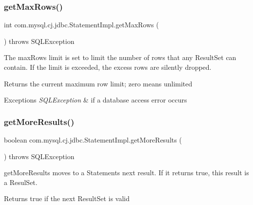 \subsubsection{\texorpdfstring{get\+Max\+Rows()}{getMaxRows()}}
{\footnotesize\ttfamily int com.\+mysql.\+cj.\+jdbc.\+Statement\+Impl.\+get\+Max\+Rows (\begin{DoxyParamCaption}{ }\end{DoxyParamCaption}) throws S\+Q\+L\+Exception}

The max\+Rows limit is set to limit the number of rows that any Result\+Set can contain. If the limit is exceeded, the excess rows are silently dropped.

\begin{DoxyReturn}{Returns}
the current maximum row limit; zero means unlimited
\end{DoxyReturn}

\begin{DoxyExceptions}{Exceptions}
{\em S\+Q\+L\+Exception} & if a database access error occurs \\
\hline
\end{DoxyExceptions}
\mbox{\label{classcom_1_1mysql_1_1cj_1_1jdbc_1_1_statement_impl_a0791ff241a89529adb0be7da26a0ec62}} 
\subsubsection{\texorpdfstring{get\+More\+Results()}{getMoreResults()}\hspace{0.1cm}{\footnotesize\ttfamily [1/2]}}
{\footnotesize\ttfamily boolean com.\+mysql.\+cj.\+jdbc.\+Statement\+Impl.\+get\+More\+Results (\begin{DoxyParamCaption}{ }\end{DoxyParamCaption}) throws S\+Q\+L\+Exception}

get\+More\+Results moves to a Statement\textquotesingle{}s next result. If it returns true, this result is a Resul\+Set.

\begin{DoxyReturn}{Returns}
true if the next Result\+Set is valid
\end{DoxyReturn}

